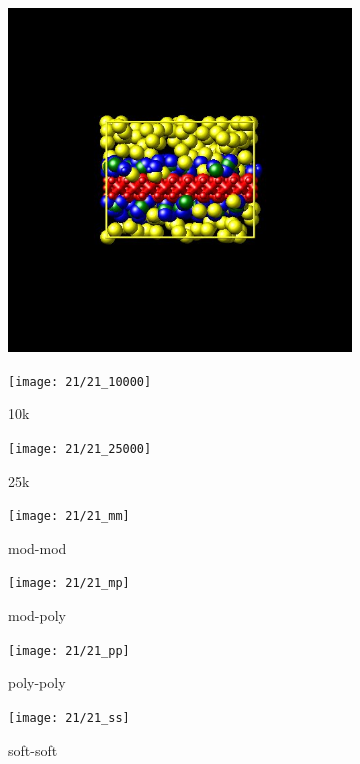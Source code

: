 \documentclass[a4paper]{article}
\begin{document}
\begin{figure}[H]
\begin{subfigure}{0.3\textwidth}
  \centering
  \includegraphics[width=\linewidth,keepaspectratio]{start}
  \caption{}
\end{subfigure}
\begin{subfigure}{0.3\textwidth}
  \centering
  \texttt{[image: 21/21\_10000]}
  \caption{10k}
\end{subfigure}
\begin{subfigure}{0.3\textwidth}
  \centering
  \texttt{[image: 21/21\_25000]}
  \caption{25k}
\end{subfigure}
\caption{}
\label{fig_1}
\end{figure}

\begin{figure}[H]
\begin{subfigure}{0.24\textwidth}
  \centering
  \texttt{[image: 21/21\_mm]}
  \caption{mod-mod}
\end{subfigure}
\begin{subfigure}{0.24\textwidth}
  \centering
  \texttt{[image: 21/21\_mp]}
  \caption{mod-poly}
\end{subfigure}
\begin{subfigure}{0.24\textwidth}
  \centering
  \texttt{[image: 21/21\_pp]}
  \caption{poly-poly}
\end{subfigure}
\begin{subfigure}{0.24\textwidth}
  \centering
  \texttt{[image: 21/21\_ss]}
  \caption{soft-soft}
\end{subfigure}
\caption{}
\label{fig_1}
\end{figure}
\end{document}

